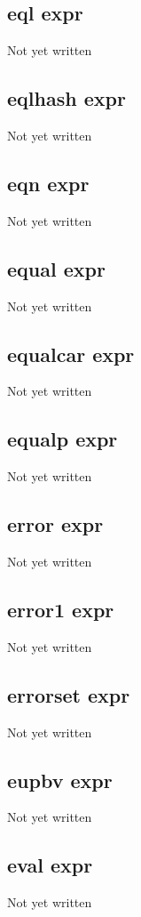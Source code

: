 \documentclass[a4paper,11pt]{article}
\begin{document}
\subsection{\ttfamily eql expr}
Not yet written

\subsection{\ttfamily eqlhash expr}
Not yet written

\subsection{\ttfamily eqn expr}
Not yet written

\subsection{\ttfamily equal expr}
Not yet written

\subsection{\ttfamily equalcar expr}
Not yet written

\subsection{\ttfamily equalp expr}
Not yet written

\subsection{\ttfamily error expr}
Not yet written

\subsection{\ttfamily error1 expr}
Not yet written

\subsection{\ttfamily errorset expr}
Not yet written

\subsection{\ttfamily eupbv expr}
Not yet written

\subsection{\ttfamily eval expr}
Not yet written
\end{document}
